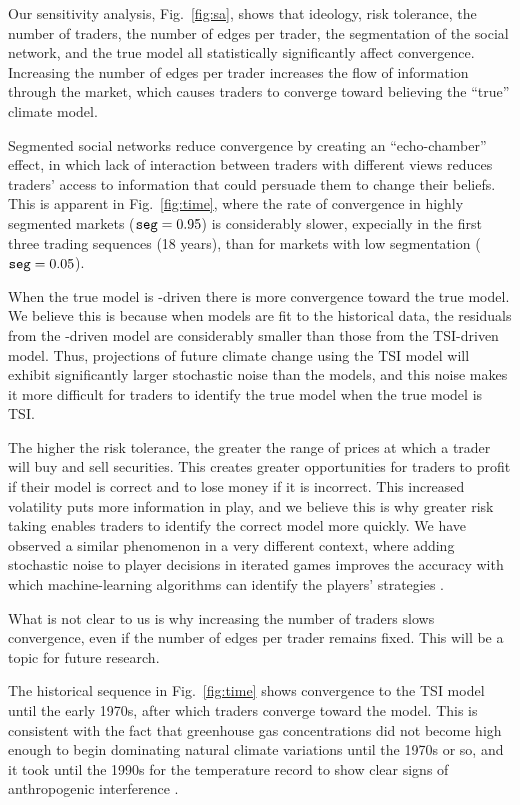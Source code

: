 \documentclass{wscpaperproc}\usepackage[]{graphicx}\usepackage[]{color}
\begin{document}
Our sensitivity analysis, Fig.~\ref{fig:sa}, shows that ideology, risk tolerance, the number of traders, the number of edges per trader, the segmentation of the social network, and the true model all statistically significantly affect convergence.  Increasing the number of edges per trader increases the flow of information through the market, which causes traders to converge toward believing the ``true'' climate model.

Segmented social networks reduce convergence by creating an ``echo-chamber'' effect, in which lack of interaction between traders with different views reduces traders' access to information that could persuade them to change their beliefs. This is apparent in Fig.~\ref{fig:time}, where the rate of convergence in highly segmented markets ($\text{\texttt{seg}} = 0.95$) is considerably slower, expecially in the first three trading sequences (18 years), than for markets with low segmentation ($\text{\texttt{seg}} = 0.05$).

When the true model is -driven there is more convergence toward the true model. We believe this is because when models are fit to the historical data, the residuals from the -driven model are considerably smaller than those from the TSI-driven model. Thus, projections of future climate change using the TSI model will exhibit significantly larger stochastic noise than the  models, and this noise makes it more difficult for traders to identify the true model when the true model is TSI.

The higher the risk tolerance, the greater the range of prices at which a trader will buy and sell securities. This creates greater opportunities for traders to profit if their model is correct and to lose money if it is incorrect. This increased volatility puts more information in play, and we believe this is why greater risk taking enables traders to identify the correct model more quickly. We have observed a similar phenomenon in a very different context, where adding stochastic noise to player decisions in iterated games improves the accuracy with which machine-learning algorithms can identify the players' strategies .

What is not clear to us is why increasing the number of traders slows convergence, even if the number of edges per trader remains fixed. This will be a topic for future research.

The historical sequence in Fig.~\ref{fig:time} shows convergence to the TSI model until the early 1970s, after which traders converge toward the  model. This is consistent with the fact that greenhouse gas concentrations did not become high enough to begin dominating natural climate variations until the 1970s or so, and it took until the 1990s for the temperature record to show clear signs of anthropogenic interference .
\end{document}
